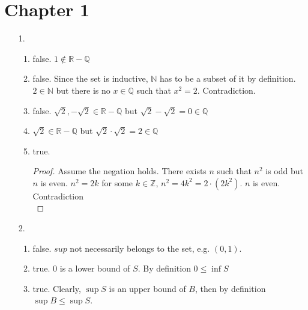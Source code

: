 \documentclass{article}
\begin{document}
\section*{Chapter 1}
\begin{itemize}
\item [1.]
  \begin{enumerate}[label=\alph*.]
  \item false. $1 \notin \mathbb{R}-\mathbb{Q}$
  \item false. Since the set is inductive, $\mathbb{N}$ has to be a
    subset of it by definition. $2\in \mathbb{N}$ but there is no $x
    \in \mathbb{Q}$ such that $x^2=2$. Contradiction.
  \item false. $\sqrt{2},-\sqrt{2} \in \mathbb{R}-\mathbb{Q}$ but
    $\sqrt{2}-\sqrt{2}=0\in\mathbb{Q}$
  \item $\sqrt{2}\in \mathbb{R}-\mathbb{Q}$ but
    $\sqrt{2}\cdot\sqrt{2}=2\in \mathbb{Q}$
  \item true.
    \begin{proof}
      Assume the negation holds.
      There exists $n$ such that $n^2$ is odd but $n$ is even.
      $n^2 = 2k$ for some $k \in \mathbb{Z}$,
      $n^2=4k^2=2\cdot(2k^2)$. $n$ is even. Contradiction\\
    \end{proof}
  \end{enumerate}
\item [2.]
  \begin{enumerate}[label=\alph*]
  \item false. $sup$ not necessarily belongs to the set, e.g. $(0,1)$.
  \item true. $0$ is a lower bound of $S$. By definition $0 \leq
    \inf{S}$
  \item true. Clearly, $\sup{S}$ is an upper bound of $B$, then by
    definition $\sup{B} \leq \sup{S}$.
  \end{enumerate}


\end{itemize}
\end{document}
